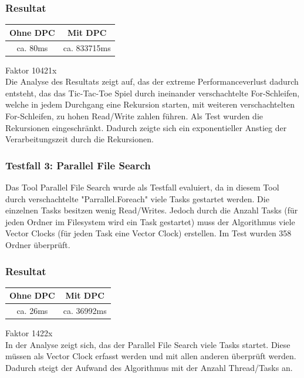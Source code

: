 \documentclass[10pt,a4paper]{article}
\begin{document}
\subsubsection*{Resultat}
 \begin{tabular}{|c|c|}
\hline 
Ohne DPC & Mit DPC \\ 
\hline 
ca. 80ms & ca. 833715ms \\ 
\hline 
\end{tabular} 
Faktor 10421x\\[0.4cm]
Die Analyse des Resultats zeigt auf, das der extreme Performanceverlust dadurch entsteht, das das Tic-Tac-Toe Spiel durch ineinander verschachtelte For-Schleifen, welche in jedem Durchgang eine Rekursion starten, mit weiteren verschachtelten For-Schleifen, zu hohen Read/Write zahlen führen. Als Test wurden die Rekursionen eingeschränkt. Dadurch zeigte sich ein exponentieller Anstieg der Verarbeitungszeit durch die Rekursionen.
\subsubsection*{Testfall 3: Parallel File Search}
Das Tool Parallel File Search wurde als Testfall evaluiert, da in diesem Tool durch verschachtelte "Parrallel.Foreach" viele Tasks gestartet werden. Die einzelnen Tasks besitzen wenig Read/Writes. Jedoch durch die Anzahl Tasks (für jeden Ordner im Filesystem wird ein Task gestartet) muss der Algorithmus viele Vector Clocks (für jeden Task eine Vector Clock) erstellen. Im Test wurden 358 Ordner überprüft.
\subsubsection*{Resultat}
\begin{tabular}{|c|c|}
\hline 
Ohne DPC & Mit DPC \\ 
\hline 
ca. 26ms & ca. 36992ms \\ 
\hline 
\end{tabular} 
Faktor 1422x\\[0.4cm]
In der Analyse zeigt sich, das der Parallel File Search viele Tasks startet. Diese müssen als Vector Clock erfasst werden und mit allen anderen überprüft werden. Dadurch steigt der Aufwand des Algorithmus mit der Anzahl Thread/Tasks an.
\end{document}
